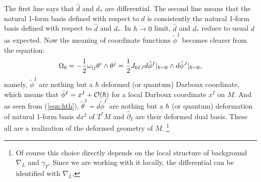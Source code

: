 \documentclass[10pt,a4paper]{article}
\def\h{\hbar}
\begin{document}
The first line says that ${\hat d}$ and $d_*$ are differential. The second line means that the natural 1-form basis defined with respect to $d$ is consistently the natural 1-form basis defined with respect to ${\hat d}$ and $d_*$. 
In $\h\rightarrow0$ limit, ${\hat d}$ and $d_*$ reduce to usual $d$ as expected. Now the meaning of coordinate functions ${\tilde \phi}^I$ becomes clearer from the equation:
\begin{equation}
\label{eqn:om0}
\Omega_0=-{1\over2}\omega_{ij}\theta^i\wedge\theta^j
={1\over2}J_{0IJ}d{\tilde \phi}^I|_{\h=0}\wedge d{\tilde \phi}^J|_{\h=0},
\end{equation}
namely, ${\tilde \phi}^I$ are nothing but a $\h$ deformed (or quantum) Darboux coordinate, which means that ${\tilde \phi}^I=x^I+{\cal O}(\h)$ for a local Darboux coordinate $x^I$ on $M$. And as seen from (\ref{eqn:hth}), ${\tilde \theta}^I=d{\tilde \phi}^I$ are nothing but a $\h$ (or quantum) deformation of natural 1-form basis $dx^I$ of $T^* M$ and ${\hat \partial}_I$ are their deformed dual basis. These all are a realization of the deformed geometry of $M$.
\footnote{Of course this choice directly depends on the local structure of background $\nabla_L$ and $\gamma_T$. Since we are working with it locally, the differential can be identified with $\nabla_L$.}\\
\end{document}
